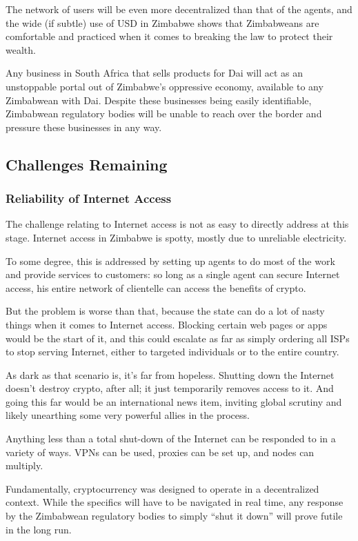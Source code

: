 \documentclass{article}
\begin{document}
The network of users will be even more decentralized than that of the agents, and the wide (if subtle) use of USD in Zimbabwe shows that Zimbabweans are comfortable and practiced when it comes to breaking the law to protect their wealth.

Any business in South Africa that sells products for Dai will act as an unstoppable portal out of Zimbabwe's oppressive economy, available to any Zimbabwean with Dai. Despite these businesses being easily identifiable, Zimbabwean regulatory bodies will be unable to reach over the border and pressure these businesses in any way.

\subsection{Challenges Remaining} \label{challenges remaining}

\subsubsection{Reliability of Internet Access} \label{reliable internet access}

The challenge relating to Internet access is not as easy to directly address at this stage. Internet access in Zimbabwe is spotty, mostly due to unreliable electricity.

To some degree, this is addressed by setting up agents to do most of the work and provide services to customers: so long as a single agent can secure Internet access, his entire network of clientelle can access the benefits of crypto.

But the problem is worse than that, because the state can do a lot of nasty things when it comes to Internet access. Blocking certain web pages or apps would be the start of it, and this could escalate as far as simply ordering all ISPs to stop serving Internet, either to targeted individuals or to the entire country.

As dark as that scenario is, it's far from hopeless. Shutting down the Internet doesn't destroy crypto, after all; it just temporarily removes access to it. And going this far would be an international news item, inviting global scrutiny and likely unearthing some very powerful allies in the process.

Anything less than a total shut-down of the Internet can be responded to in a variety of ways. VPNs can be used, proxies can be set up, and nodes can multiply.

Fundamentally, cryptocurrency was designed to operate in a decentralized context. While the specifics will have to be navigated in real time, any response by the Zimbabwean regulatory bodies to simply ``shut it down'' will prove futile in the long run.
\end{document}
